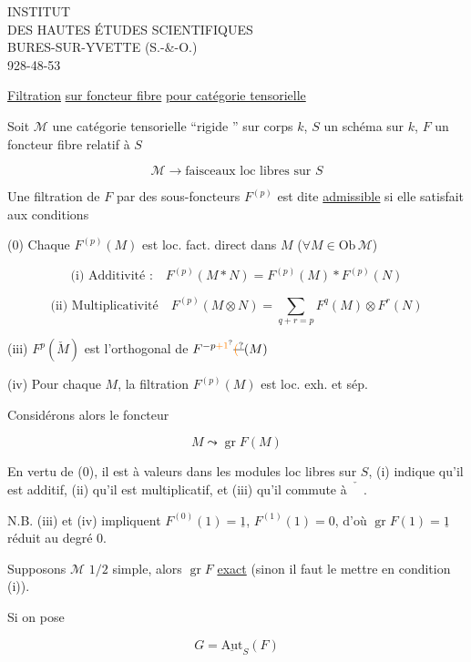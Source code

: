 
INSTITUT\\
DES HAUTES ÉTUDES SCIENTIFIQUES\\
BURES-SUR-YVETTE (S.-\&-O.)\\
928-48-53

\uline{Filtration} \uline{sur foncteur fibre} \uline{pour catégorie tensorielle}

Soit  $\mathcal M$ une catégorie tensorielle  ``rigide '' sur corps $k$, $S$ un schéma sur $k$, $F$ un foncteur fibre relatif à $S$

\[
\mathcal M\longrightarrow\text{faisceaux loc libres sur } S
\]

Une filtration de $F$ par des sous-foncteurs $F^{(p)}$ est dite \uline{admissible} si elle satisfait aux conditions

(0) Chaque $F^{(p)}(M)$ est loc. fact. direct dans $M$ ($\forall M\in\mathrm{Ob}\,\mathcal M$)

\[
\text{(i) Additivité :}\quad F^{(p)}(M\ast N)=F^{(p)}(M)\ast F^{(p)}(N)
\]

\[
\text{(ii) Multiplicativité}\quad F^{(p)}(M\otimes N)=\sum_{q+r=p}F^q(M)\otimes F^r(N)
\]

(iii) $F^p(\check M)$ est l'orthogonal de $F^{-p\unsure{+1}}\deleted{\unsure{(}}(M)$

(iv) Pour chaque $M$, la filtration $F^{(p)}(M)$ est loc. exh. et sép.

Considérons alors le foncteur

\[
M\leadsto\operatorname{gr}F(M)
\]

En vertu de (0), il est à valeurs dans les modules loc libres  sur $S$, (i) indique qu'il est additif, (ii) qu'il est multiplicatif, et (iii) qu'il commute à $\check{\phantom M}$.

 N.B.  (iii) et (iv) impliquent $F^{(0)}(1)=\underline{1}$, $F^{(1)}(1)=0$, d'où $\operatorname{gr}F(1)=\underline{1}$ réduit au degré $0$.

Supposons $\mathcal M$ $1/2$ simple, alors $\operatorname{gr}F$ \uline{exact} (sinon il faut le mettre en condition  (i)).

Si on pose


\[
G=\underline{\mathrm{Aut}}_S(F)
\]

